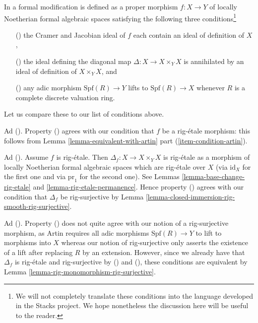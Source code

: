 \begin{remark}
\label{remark-compare-formal-modification-artin}
In \cite[Definition 1.7]{ArtinII} a formal modification is defined as a
proper morphism $f : X \to Y$ of locally Noetherian formal algebraic spaces
satisfying the following three conditions\footnote{We will not completely
translate these conditions into the language developed in the Stacks
project. We hope nonetheless the discussion here will be useful to the
reader.}
\begin{enumerate}
\item[(\romannumeral1)] the Cramer and Jacobian ideal of
$f$ each contain an ideal of definition of $X$,
\item[(\romannumeral2)] the ideal defining the
diagonal map $\Delta : X \to X \times_Y X$
is annihilated by an ideal of definition of $X \times_Y X$, and
\item[(\romannumeral3)] any adic morphism $\text{Spf}(R) \to Y$
lifts to $\text{Spf}(R) \to X$ whenever $R$ is a
complete discrete valuation ring.
\end{enumerate}
Let us compare these to our list of conditions above.

\medskip\noindent
Ad (). Property () agrees with our condition
that $f$ be a rig-\'etale morphism: this follows from
Lemma \ref{lemma-equivalent-with-artin} part (\ref{item-condition-artin}).

\medskip\noindent
Ad (). Assume $f$ is rig-\'etale. Then
$\Delta_f : X \to X \times_Y X$ is rig-\'etale as a morphism
of locally Noetherian formal algebraic spaces which are
rig-\'etale over $X$ (via $\text{id}_X$ for the first one and via
$\text{pr}_1$ for the second one).
See Lemmas \ref{lemma-base-change-rig-etale} and
\ref{lemma-rig-etale-permanence}.
Hence property () agrees with our condition
that $\Delta_f$ be rig-surjective by
Lemma \ref{lemma-closed-immersion-rig-smooth-rig-surjective}.

\medskip\noindent
Ad (). Property () does not quite
agree with our notion of a rig-surjective morphism, as Artin
requires all adic morphisms $\text{Spf}(R) \to Y$ to lift to
morphisms into $X$ whereas our notion of rig-surjective only
asserts the existence of a lift after replacing $R$ by an extension.
However, since we already have that $\Delta_f$ is
rig-\'etale and rig-surjective by () and (),
these conditions are equivalent by
Lemma \ref{lemma-rig-monomorphism-rig-surjective}.
\end{remark}

